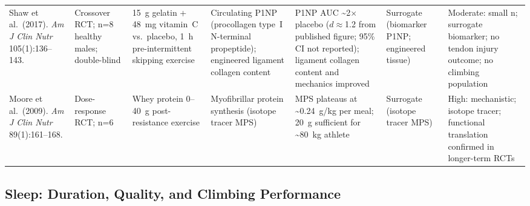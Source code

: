 \begin{center}
\begin{longtable}{@{}>{\raggedright}p{3.0cm} >{\raggedright}p{3cm} >{\raggedright}p{2.5cm} >{\raggedright}p{2.5cm} >{\raggedright}p{2.5cm} >{\raggedright}p{1.6cm} >{\raggedright\arraybackslash}p{1.8cm}@{}}
Shaw et al.\ (2017). \emph{Am J Clin Nutr} 105(1):136--143. \cite{SLRE17}
& Crossover RCT; n=8 healthy males; double-blind
& 15~g gelatin + 48~mg vitamin~C vs.\ placebo, 1~h pre-intermittent skipping exercise
& Circulating P1NP (procollagen type~I N-terminal propeptide); engineered ligament collagen content
& P1NP AUC \textasciitilde{}2$\times$ placebo ($d\approx$1.2 from published figure; 95\% CI not reported); ligament collagen content and mechanics improved
& Surrogate (biomarker P1NP; engineered tissue)
& Moderate: small n; surrogate biomarker; no tendon injury outcome; no climbing population \\

Moore et al.\ (2009). \emph{Am J Clin Nutr} 89(1):161--168. \cite{MRFE09}
& Dose-response RCT; n=6
& Whey protein 0--40~g post-resistance exercise
& Myofibrillar protein synthesis (isotope tracer MPS)
& MPS plateaus at \textasciitilde{}0.24~g/kg per meal; 20~g sufficient for \textasciitilde{}80~kg athlete
& Surrogate (isotope tracer MPS)
& High: mechanistic; isotope tracer; functional translation confirmed in longer-term RCTs \\

\end{longtable}
\setlength{\tabcolsep}{6pt}
\end{center}

\subsection{Sleep: Duration, Quality, and Climbing Performance}

